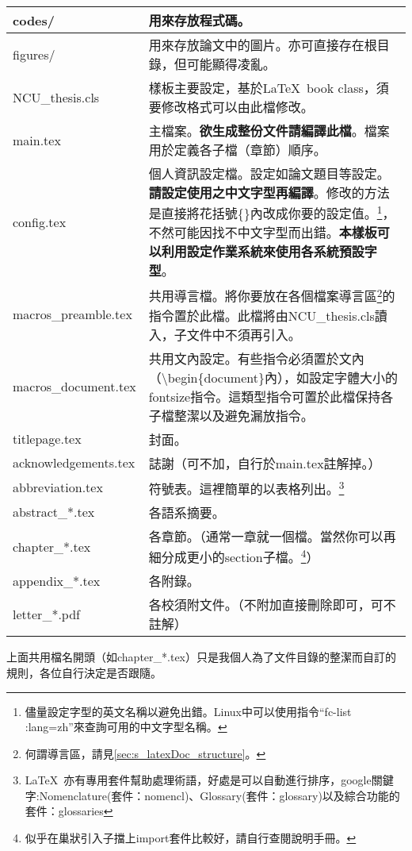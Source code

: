 \documentclass[class=NCU_thesis, crop=false, float=true]{standalone}
\begin{document}
\begin{table}[h]
    \centering
    \begin{tabularx}{\textwidth}{| l | X |}
        \hline
        codes/  & 用來存放程式碼。 \\ \hline
        figures/    & 用來存放論文中的圖片。亦可直接存在根目錄，但可能顯得凌亂。 \\ \hline
        NCU\_thesis.cls & 樣板主要設定，基於\LaTeX\ book class，須要修改格式可以由此檔修改。 \\ \hline
        main.tex & 主檔案。\textbf{欲生成整份文件請編譯此檔}。檔案用於定義各子檔（章節）順序。  \\ \hline
        config.tex & 個人資訊設定檔。設定如論文題目等設定。\textbf{請設定使用之中文字型再編譯}。修改的方法是直接將花括號\{\}內改成你要的設定值。\footnote{儘量設定字型的英文名稱以避免出錯。Linux中可以使用指令``fc-list :lang=zh''來查詢可用的中文字型名稱。}，不然可能因找不中文字型而出錯。\textbf{本樣板可以利用設定作業系統來使用各系統預設字型}。  \\ \hline
        macros\_preamble.tex & 共用導言檔。將你要放在各個檔案導言區\footnote{何謂導言區，請見\cref{sec:s_latexDoc_structure}。}的指令置於此檔。此檔將由NCU\_thesis.cls讀入，子文件中不須再引入。  \\ \hline
        macros\_document.tex & 共用文內設定。有些指令必須置於文內（\textbackslash{}begin\{document\}內），如設定字體大小的fontsize指令。這類型指令可置於此檔保持各子檔整潔以及避免漏放指令。  \\ \hline
        titlepage.tex & 封面。  \\ \hline
        acknowledgements.tex & 誌謝（可不加，自行於main.tex註解掉。）  \\ \hline
        abbreviation.tex & 符號表。這裡簡單的以表格列出。\footnote{\LaTeX\ 亦有專用套件幫助處理術語，好處是可以自動進行排序，google關鍵字:Nomenclature(套件：nomencl)、Glossary(套件：glossary)以及綜合功能的套件：glossaries}  \\ \hline
        abstract\_*.tex & 各語系摘要。  \\ \hline
        chapter\_*.tex & 各章節。（通常一章就一個檔。當然你可以再細分成更小的section子檔。\footnote{似乎在巢狀引入子擋上import套件比較好，請自行查閱說明手冊。}）  \\ \hline
        appendix\_*.tex & 各附錄。  \\ \hline
        letter\_*.pdf & 各校須附文件。（不附加直接刪除即可，可不註解）  \\ \hline
    \end{tabularx}
\end{table}
上面共用檔名開頭（如chapter\_*.tex）只是我個人為了文件目錄的整潔而自訂的規則，各位自行決定是否跟隨。
\end{document}
